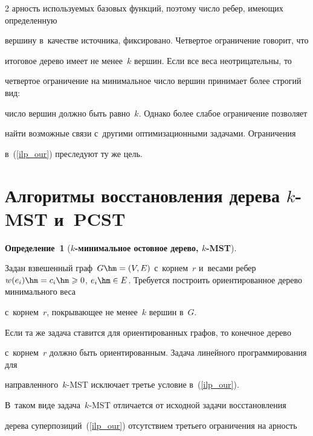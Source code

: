 \begin{multicols}{2}
арность используемых базовых функций, поэтому число ребер, имеющих определенную 

вершину в~качестве источника, фиксировано. Четвертое ограничение говорит, что 

итоговое дерево имеет не менее~$k$ вершин. Если все веса неотрицательны, то 

четвертое ограничение на минимальное число вершин принимает более строгий вид: 

число вершин должно быть равно~$k$. Однако более слабое ограничение позволяет 

найти возможные связи с~другими оптимизационными задачами. Ограничения 

в~(\ref{ilp_our}) преследуют ту же цель.



\vspace*{-9pt}



\section{Алгоритмы восстановления дерева $k$-MST и~PCST}



\vspace*{-3pt}



\noindent

\textbf{Определение~1} (\textbf{$k$-минимальное остовное дерево, $k$-MST}).

Задан взвешенный граф~$G\hm=(V,E)$ с~корнем~$r$ и~весами ребер~$w(e_i)\hm=c_i\hm\geqslant 

0$, $e_i\hm\in E$. Требуется построить ориентированное дерево минимального веса 

с~корнем~$r$, покрывающее не менее~$k$ вершин в~$G$.



\smallskip



Если та же задача ставится для ориентированных графов, то конечное дерево 

с~корнем~$r$ должно быть ориентированным. Задача линейного программирования для 

направленного~$k$-MST исключает третье условие в~(\ref{ilp_our}).

В~таком виде задача~$k$-MST отличается от исходной задачи восстановления 

дерева суперпозиций~(\ref{ilp_our}) отсутствием третьего ограничения на арность 


\end{multicols}
